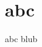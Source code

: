 \documentclass{article}
\begin{document}
\tagpdfparaOff
{}%
\section{abc}\label{abc}
\tagmcend\tagstructend
\tagpdfparaOn


abc  blub
\end{document}
